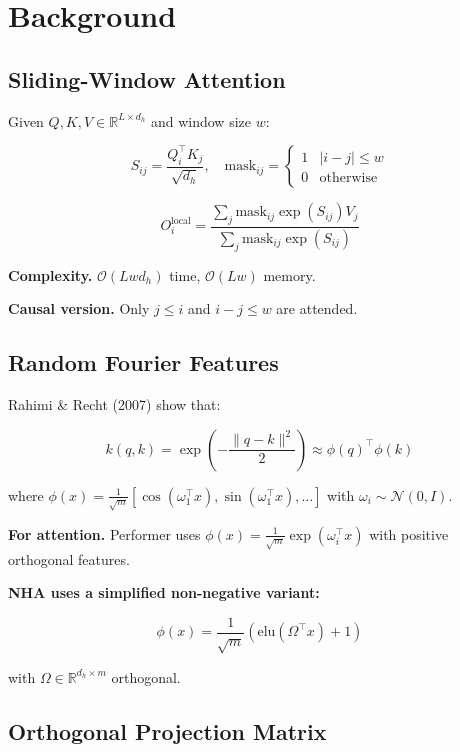 
\section{Background}

\subsection{Sliding-Window Attention}

Given $Q, K, V \in \mathbb{R}^{L \times d_h}$ and window size $w$:

\[
S_{ij} = \frac{Q_i^\top K_j}{\sqrt{d_h}}, \quad
\text{mask}_{ij} = \begin{cases} 1 & |i - j| \leq w \\ 0 & \text{otherwise} \end{cases}
\tag{3.1}
\]

\[
O_i^\text{local} = \frac{\sum_j \text{mask}_{ij} \exp(S_{ij}) V_j}{\sum_j \text{mask}_{ij} \exp(S_{ij})}
\tag{3.2}
\]

\textbf{Complexity.} $\mathcal{O}(L w d_h)$ time, $\mathcal{O}(L w)$ memory.

\textbf{Causal version.} Only $j \le i$ and $i - j \leq w$ are attended.

\subsection{Random Fourier Features}

Rahimi \& Recht (2007) show that:

\[
k(q, k) = \exp\!\left(-\frac{\|q - k\|^2}{2}\right) \approx \phi(q)^\top \phi(k)
\tag{3.3}
\]

where $\phi(x) = \frac{1}{\sqrt{m}} \left[\cos(\omega_1^\top x), \sin(\omega_1^\top x), \ldots\right]$ 
with $\omega_i \sim \mathcal{N}(0, I)$.

\textbf{For attention.} Performer uses $\phi(x) = \frac{1}{\sqrt{m}} \exp(\omega_i^\top x)$ 
with positive orthogonal features.

\textbf{NHA uses a simplified non-negative variant:}

\[
\phi(x) = \frac{1}{\sqrt{m}} (\mathrm{elu}(\Omega^\top x) + 1)
\tag{3.4}
\]

with $\Omega \in \mathbb{R}^{d_h \times m}$ orthogonal.

\subsection{Orthogonal Projection Matrix}

